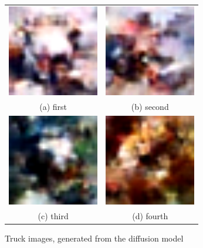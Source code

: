 \documentclass[conference]{IEEEtran}
\begin{document}
  \begin{figure}
    \begin{tabular}{cc}
      \includegraphics[width=40mm]{./images/generated-imgs-cosine/truck/0918.png} 
  &   \includegraphics[width=40mm]{./images/generated-imgs-cosine/truck/0919.png} 
  \\
    (a) first 
    & (b) second \\[6pt]
       \includegraphics[width=40mm]{./images/generated-imgs-cosine/truck/0920.png} 
    &  \includegraphics[width=40mm]{./images/generated-imgs-cosine/truck/0921.png} 
  \\
    (c) third & (d) fourth \\[6pt]
    \end{tabular}
    \caption{Truck images, generated from the diffusion model}
    \end{figure}
\end{document}
